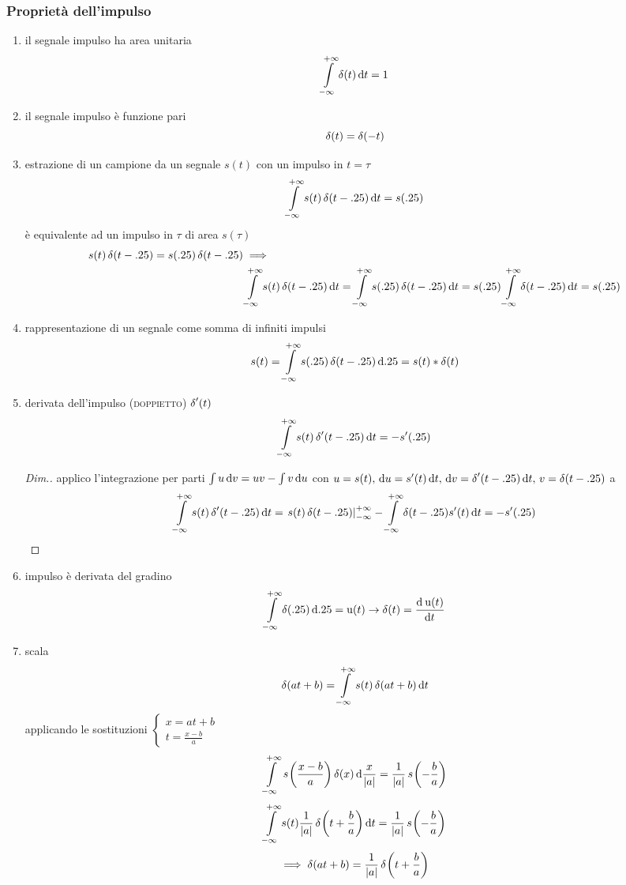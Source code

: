 \subsubsection{Proprietà dell'impulso}
\begin{enumerate}
\item il segnale impulso ha area unitaria \[ \intinf{\impulse(t)}{t}=1 \]
\item il segnale impulso è funzione pari \[ \impulse(t)=\impulse(-t) \]
\item estrazione di un campione da un segnale $s(t)$ con un impulso in $t=\tau$ \[ \intinf{s(t)\impulse(t-\tau)}{t}=s(\tau) \]
è equivalente ad un impulso in $\tau$ di area $s(\tau)$
\begin{align*}
 s(t)\impulse(t-\tau)=s(\tau)\impulse(t-\tau) &\implies \\ & \intinf{s(t)\impulse(t-\tau)}{t} =\intinf{s(\tau)\impulse(t-\tau)}{t} = s(\tau)\intinf{\impulse(t-\tau)}{t} = s(\tau)
 \end{align*}
 
\item rappresentazione di un segnale come somma di infiniti impulsi
\[s(t)=\intinf{s(\tau)\impulse(t-\tau)}{\tau}=s(t)\ast\impulse(t)\]
\item derivata dell'impulso (\textsc{doppietto}) $\impulse'(t)$
\[ \intinf{s(t)\impulse'(t-\tau)}{t}=-s'(\tau) \]
\begin{proof}[Dim.]
applico l'integrazione per parti $\int{u \diff v}=u v-\int{v\diff u}$ con $u=s(t) ,\, \diff u=s'(t)\diff t ,\, \diff v=\impulse'(t-\tau)\diff t ,\, v=\impulse(t-\tau)$  a 
\[\intinf{s(t)\impulse'(t-\tau)}{t}= \restrict{s(t)\impulse(t-\tau)}{-\infty}^{+\infty} -\intinf{\impulse(t-\tau)s'(t)}{t}=-s'(\tau)  \]
\end{proof}
\item impulso è derivata del gradino
\[\intinf{\impulse(\tau)}{\tau}=\step(t)  \to \impulse(t)=\deriv{\step(t)}{t} \]
\item scala
\[\impulse(a t+b)=\intinf{s(t)\impulse(a t+b)}{t}\]
applicando le sostituzioni $\begin{cases}x=a t+b \\ t=\frac{x-b}{a}\end{cases}$
\[\intinf{\f{s}{\frac{x-b}{a}}\impulse(x)}{\frac{x}{\abs{a}}}=\frac{1}{\abs{a}}\f{s}{-\frac{b}{a}}\]
\[\intinf{s(t)\frac{1}{\abs{a}}\f{\impulse}{t+\frac{b}{a}}}{t}=\frac{1}{\abs{a}}\f{s}{-\frac{b}{a}}\]
\[\implies\impulse(a t+b)=\frac{1}{\abs{a}}\f{\impulse}{t+\frac{b}{a}} \]

\end{enumerate}

